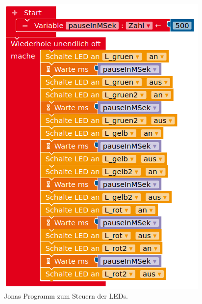 \documentclass[ngerman, 11pt]{scrreprt}
\begin{document}
\begin{figure}[H]
\begin{adjustwidth}{-1.5cm}{1.5cm}
\begin{minipage}{0.58\textwidth}
				\includegraphics[width=\textwidth]{../pics/lauflicht-mit-variable.png}
				\caption{Jonas Programm zum Steuern der LEDs.}
			\end{minipage}
		\end{adjustwidth}
	\end{figure}
\end{document}
